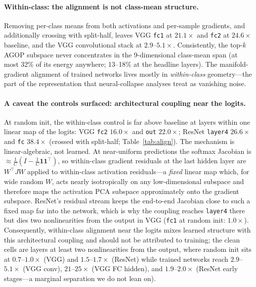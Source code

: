 \documentclass{article}
\begin{document}
\paragraph{Within-class: the alignment is not class-mean structure.}
Removing per-class means from both activations and per-sample gradients, and
additionally crossing with split-half, leaves VGG \texttt{fc1} at
$21.1\times$ and \texttt{fc2} at $24.6\times$ baseline, and the VGG
convolutional stack at $2.9$--$5.1\times$.  Consistently, the top-$k$ AGOP
subspace never concentrates in the 9-dimensional class-mean span (at most
32\% of its energy anywhere; 13--18\% at the headline layers).  The
manifold-gradient alignment of trained networks lives mostly in
\emph{within-class} geometry---the part of the representation that
neural-collapse analyses treat as vanishing noise.

\paragraph{A caveat the controls surfaced: architectural coupling near the
logits.}
At random init, the within-class control is far above baseline at layers
within one linear map of the logits: VGG \texttt{fc2} $16.0\times$ and
\texttt{out} $22.0\times$; ResNet \texttt{layer4} $26.6\times$ and
\texttt{fc} $38.4\times$ (crossed with split-half; Table~\ref{tab:align}).
The mechanism is linear-algebraic, not learned.  At near-uniform predictions
the softmax Jacobian is ${\approx}\frac{1}{C}(I - \frac{1}{C}\mathbf{1}
\mathbf{1}^\top)$, so within-class gradient residuals at the last hidden
layer are $W^\top J W$ applied to within-class activation residuals---a
\emph{fixed} linear map which, for wide random $W$, acts nearly
isotropically on any low-dimensional subspace and therefore maps the
activation PCA subspace approximately onto the gradient subspace.  ResNet's
residual stream keeps the end-to-end Jacobian close to such a fixed map far
into the network, which is why the coupling reaches \texttt{layer4} there
but dies two nonlinearities from the output in VGG (\texttt{fc1} at random
init: $1.0\times$).  Consequently, within-class alignment near the logits
mixes learned structure with this architectural coupling and should not be
attributed to training; the clean cells are layers at least two
nonlinearities from the output, where random init sits at
$0.7$--$1.0\times$ (VGG) and $1.5$--$1.7\times$ (ResNet) while trained
networks reach $2.9$--$5.1\times$ (VGG conv), $21$--$25\times$ (VGG FC
hidden), and $1.9$--$2.0\times$ (ResNet early stages---a marginal
separation we do not lean on).
\end{document}
